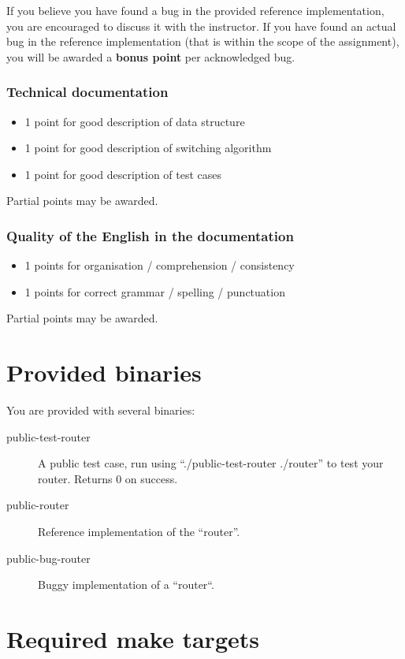 \documentclass{article}
\begin{document}
If you believe you have found a bug in the provided reference
implementation, you are encouraged to discuss it with the
instructor. If you have found an actual bug in the reference
implementation (that is within the scope of the assignment), you will
be awarded a {\bf bonus point} per acknowledged bug.


\subsubsection{Technical documentation}
\begin{itemize}
\item 1 point for good description of data structure
\item 1 point for good description of switching algorithm
\item 1 point for good description of test cases
\end{itemize}
Partial points may be awarded.

\subsubsection{Quality of the English in the documentation}

\begin{itemize}
\item 1 points for organisation / comprehension / consistency
\item 1 points for correct grammar / spelling / punctuation
\end{itemize}
Partial points may be awarded.



\section{Provided binaries} \label{sec:binaries}

You are provided with several binaries:
\begin{description}
\item[public-test-router] A public test case, run using ``./public-test-router ./router''
  to test your router. Returns 0 on success.
\item[public-router] Reference implementation of the ``router''.
\item[public-bug-router] Buggy implementation of a ``router``.
\end{description}


\section{Required make targets}
\end{document}
